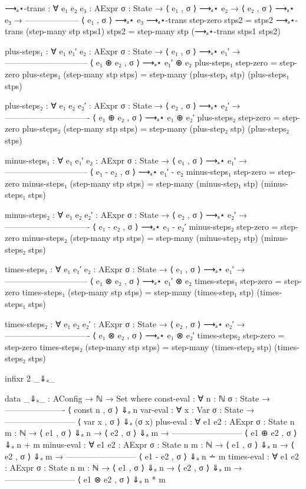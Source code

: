 \documentclass{lecturenotes}
\begin{document}
\begin{code}[hide]
⟶ₐ⋆-trans : ∀ {e₁ e₂ e₃ : AExpr} {σ : State} →
  ⟨ e₁ , σ ⟩ ⟶ₐ⋆ e₂ →
  ⟨ e₂ , σ ⟩ ⟶ₐ⋆ e₃ →
  --------------------
  ⟨ e₁ , σ ⟩ ⟶ₐ⋆ e₃
⟶ₐ⋆-trans step-zero stps2 = stps2
⟶ₐ⋆-trans (step-many stp stps1) stps2 = step-many stp (⟶ₐ⋆-trans stps1 stps2)

plus-steps₁ : ∀ {e₁ e₁′ e₂ : AExpr} {σ : State} →
        ⟨ e₁ , σ ⟩ ⟶ₐ⋆ e₁′ →
  ------------------------------
   ⟨ e₁ ⊕ e₂ , σ ⟩ ⟶ₐ⋆ e₁′ ⊕ e₂
plus-steps₁ step-zero = step-zero
plus-steps₁ (step-many stp stps) = step-many (plus-step₁ stp) (plus-steps₁ stps)

plus-steps₂ : ∀ {e₁ e₂ e₂′ : AExpr} {σ : State} →
         ⟨ e₂ , σ ⟩ ⟶ₐ⋆ e₂′ →
  -------------------------------
    ⟨ e₁ ⊕ e₂ , σ ⟩ ⟶ₐ⋆ e₁ ⊕ e₂′
plus-steps₂ step-zero = step-zero
plus-steps₂ (step-many stp stps) = step-many (plus-step₂ stp) (plus-steps₂ stps)

minus-steps₁ : ∀ {e₁ e₁′ e₂ : AExpr} {σ : State} →
        ⟨ e₁ , σ ⟩ ⟶ₐ⋆ e₁′ →
  ------------------------------
   ⟨ e₁ - e₂ , σ ⟩ ⟶ₐ⋆ e₁′ - e₂
minus-steps₁ step-zero = step-zero
minus-steps₁ (step-many stp stps) = step-many (minus-step₁ stp) (minus-steps₁ stps)

minus-steps₂ : ∀ {e₁ e₂ e₂′ : AExpr} {σ : State} →
         ⟨ e₂ , σ ⟩ ⟶ₐ⋆ e₂′ →
  -------------------------------
    ⟨ e₁ - e₂ , σ ⟩ ⟶ₐ⋆ e₁ - e₂′
minus-steps₂ step-zero = step-zero
minus-steps₂ (step-many stp stps) = step-many (minus-step₂ stp) (minus-steps₂ stps)

times-steps₁ : ∀ {e₁ e₁′ e₂ : AExpr} {σ : State} →
        ⟨ e₁ , σ ⟩ ⟶ₐ⋆ e₁′ →
  ------------------------------
   ⟨ e₁ ⊗ e₂ , σ ⟩ ⟶ₐ⋆ e₁′ ⊗ e₂
times-steps₁ step-zero = step-zero
times-steps₁ (step-many stp stps) = step-many (times-step₁ stp) (times-steps₁ stps)

times-steps₂ : ∀ {e₁ e₂ e₂′ : AExpr} {σ : State} →
         ⟨ e₂ , σ ⟩ ⟶ₐ⋆ e₂′ →
  -------------------------------
    ⟨ e₁ ⊗ e₂ , σ ⟩ ⟶ₐ⋆ e₁ ⊗ e₂′
times-steps₂ step-zero = step-zero
times-steps₂ (step-many stp stps) = step-many (times-step₂ stp) (times-steps₂ stps)


infixr 2 _⇓ₐ_

data _⇓ₐ_ : AConfig → ℕ → Set where
  const-eval : ∀ {n : ℕ} {σ : State} →
               ----------------------
                ⟨ const n , σ ⟩ ⇓ₐ n
  var-eval : ∀ {x : Var} {σ : State} →
             --------------------------
               ⟨ var x , σ ⟩ ⇓ₐ (σ x)
  plus-eval : ∀ {e1 e2 : AExpr} {σ : State} {n m : ℕ} →
         ⟨ e1 , σ ⟩ ⇓ₐ n →
         ⟨ e2 , σ ⟩ ⇓ₐ m →
    --------------------------
     ⟨ e1 ⊕ e2 , σ ⟩ ⇓ₐ n + m
  minus-eval : ∀ {e1 e2 : AExpr} {σ : State} {n m : ℕ} →
         ⟨ e1 , σ ⟩ ⇓ₐ n →
         ⟨ e2 , σ ⟩ ⇓ₐ m →
    --------------------------
     ⟨ e1 - e2 , σ ⟩ ⇓ₐ n ∸ m
  times-eval : ∀ {e1 e2 : AExpr} {σ : State} {n m : ℕ} →
         ⟨ e1 , σ ⟩ ⇓ₐ n →
         ⟨ e2 , σ ⟩ ⇓ₐ m →
    --------------------------
     ⟨ e1 ⊗ e2 , σ ⟩ ⇓ₐ n * m



\end{code}
\end{document}
